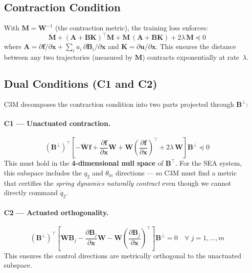 \documentclass[11pt, a4paper]{article}
\newcommand{\bu}{\bm{u}}
\newcommand{\bx}{\bm{x}}
\newcommand{\bB}{\bm{B}}
\newcommand{\bW}{\bm{W}}
\begin{document}
\subsection{Contraction Condition}

With $\bm{M} = \bW^{-1}$ (the contraction metric), the training loss enforces:
\begin{equation}
\label{eq:contraction}
\dot{\bm{M}} + (\bm{A} + \bB\bm{K})^\top \bm{M}
  + \bm{M}\,(\bm{A} + \bB\bm{K})
  + 2\lambda\,\bm{M} \preceq 0
\end{equation}
where $\bm{A} = \partial\bm{f}/\partial\bx + \sum_i u_i\,\partial\bB_i/\partial\bx$
and $\bm{K} = \partial\bu/\partial\bx$.  This ensures the distance between
any two trajectories (measured by $\bm{M}$) contracts exponentially at rate~$\lambda$.

\subsection{Dual Conditions (C1 and C2)}

C3M decomposes the contraction condition into two parts projected through
$\bB^\perp$:

\paragraph{C1 --- Unactuated contraction.}
\begin{equation}
\label{eq:C1}
(\bB^\perp)^\top
\left[
-\dot{\bW}\bm{f}
+ \frac{\partial\bm{f}}{\partial\bx}\bW
+ \bW\left(\frac{\partial\bm{f}}{\partial\bx}\right)^\top
+ 2\lambda\,\bW
\right]
\bB^\perp \preceq 0
\end{equation}
This must hold in the \textbf{4-dimensional null space} of $\bB^\top$.
For the SEA system, this subspace includes the $q_2$ and $\theta_m$ directions
--- so C3M must find a metric that certifies the \emph{spring dynamics naturally
contract} even though we cannot directly command $\ddot{q}_2$.

\paragraph{C2 --- Actuated orthogonality.}
\begin{equation}
\label{eq:C2}
(\bB^\perp)^\top
\left[
\dot{\bW}\bB_j
- \frac{\partial\bB_j}{\partial\bx}\bW
- \bW\left(\frac{\partial\bB_j}{\partial\bx}\right)^\top
\right]
\bB^\perp = 0
\quad \forall\; j = 1, \ldots, m
\end{equation}
This ensures the control directions are metrically orthogonal to the
unactuated subspace.
\end{document}
